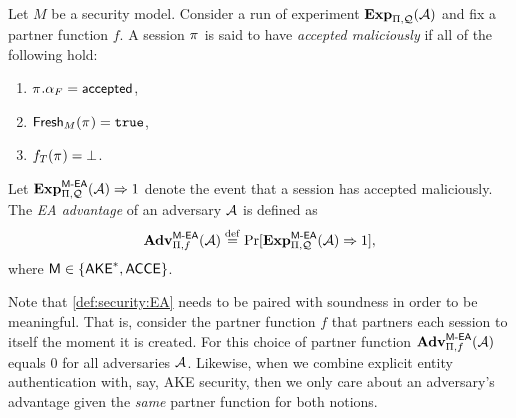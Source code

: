 \begin{definition}\label{def:security:EA}
Let $M$ be a security model.
Consider a run of experiment $\mathbf{Exp}_{\mathrm{\Pi},\mathcal{Q}}^{}(\mathcal{A})$ and fix a partner function $f$. 
A session $\oracle$ is said to have \emph{accepted maliciously} if all of the following hold:
\begin{enumerate}
	\item $\oracle.\runstate_F = \accepted$,
	
	\item $\fresh_{M}(\oracle) = \TRUE$,
	
	\item $f_T(\oracle) = \bot$.
\end{enumerate}
Let $\mathbf{Exp}_{\mathrm{\Pi},\mathcal{Q}}^{\operatorname{\mathsf{M-EA}}}(\mathcal{A}) \Rightarrow 1$ denote the event that a session has accepted maliciously. 
The \emph{EA advantage} of an adversary $\mathcal{A}$ is defined as
\begin{equation}
\mathbf{Adv}_{\mathrm{\Pi},f}^{\operatorname{\mathsf{M-EA}}}(\mathcal{A}) \overset{\mathrm{def}}{=} \Pr[\mathbf{Exp}_{\mathrm{\Pi},\mathcal{Q}}^{\operatorname{\mathsf{M-EA}}}(\mathcal{A}) \Rightarrow 1] ,
\end{equation} 
where $\mathsf{M} \in \lbrace \mathsf{AKE}^*, \mathsf{ACCE} \rbrace$.
\end{definition}

Note that \cref{def:security:EA} needs to be paired with soundness in order to be meaningful.
That is, consider the partner function $f$ that partners each session to itself the moment it is created.
For this choice of partner function  $\mathbf{Adv}_{\mathrm{\Pi},f}^{\operatorname{\mathsf{M-EA}}}(\mathcal{A})$ equals $0$ for all adversaries $\mathcal{A}$.
Likewise,
when we combine explicit entity authentication with,
say,
AKE security,
then we only care about an adversary's advantage given the \emph{same} partner function for both notions.


